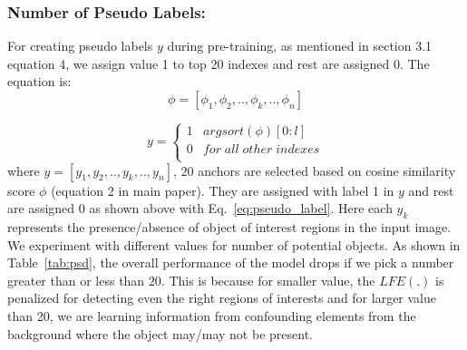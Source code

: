 \documentclass{bmvc2k}
\begin{document}
\subsubsection{Number of Pseudo Labels:} For creating pseudo labels $y$  during pre-training, as mentioned in section 3.1 equation 4, we assign value 1 to top 20 indexes and rest are assigned 0. The equation is:
\begin{equation}
    \phi = [\phi_1, \phi_2, .., \phi_k, .., \phi_n]
    \label{eq:pseudo_label2}
\end{equation}

\begin{equation}
  y =
    \begin{cases}
      1 & argsort(\phi)[0:l]\\
      0 & for\; all\; other\;indexes\\
    \end{cases}
    \label{eq:pseudo_label}
\end{equation}
where $y = [y_1, y_2, .., y_k, .., y_n]$, $20$ anchors are selected based on cosine similarity score $\phi$ (equation 2 in main paper). They are assigned with label 1 in $y$ and rest are assigned 0 as shown above with Eq.~\ref{eq:pseudo_label}. Here each $y_k$ represents the presence/absence of object of interest regions in the input image. 
We experiment with different values for number of potential objects. As shown in Table~\ref{tab:psd}, the overall performance of the model drops if we pick a number greater than or less than $20$. This is because for smaller value, the $LFE(.)$ is penalized for detecting even the right regions of interests and for larger value than 20, we are learning information from confounding elements from the background where the object may/may not be present.
\end{document}
